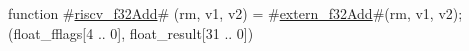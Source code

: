 function #\hyperref[sailRISCVzriscvzyf32Add]{riscv\_f32Add}# (rm, v1, v2) = {
  #\hyperref[sailRISCVzexternzyf32Add]{extern\_f32Add}#(rm, v1, v2);
  (float_fflags[4 .. 0], float_result[31 .. 0])
}
